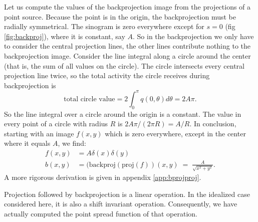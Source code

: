 \documentclass[11pt,oneside]{book}
\begin{document}
Let us compute the values of the backprojection image from the
projections of a point source. Because the point is in the origin, the
backprojection must be radially symmetrical. The sinogram is zero
everywhere except for $s = 0$ (fig \ref{fig:backproj}), where it is
constant, say $A$. So in the backprojection we only have to consider the
central projection lines, the other lines contribute nothing to the
backprojection image.  Consider the line integral along a circle
around the center (that is, the sum of all values on the circle). The
circle intersects every central projection line twice, so the total
activity the circle receives during backprojection is
\begin{equation}
  \mbox{total circle value} = 2 \int_0^\pi q(0, \theta) d \theta = 2 A\pi.
  \label{eq:bprojvalue}
\end{equation}
So the line integral over a circle around the origin is a constant. The value
in every point of a circle with radius $R$ is $2 A \pi / (2 \pi R) =
A/R$. In conclusion, starting with an image $f(x,y)$ which is zero everywhere,
except in the center where it equals $A$, we find:
\begin{align}
  f(x,y) &= A \delta(x) \delta(y)\\
 b(x,y) &= (\mbox{backproj}(\mbox{proj}(f))(x,y) \; = \;
  \frac{A}{\sqrt{x^2 + y^2}}.
\end{align}
A more rigorous derivation is given in appendix \ref{app:bprojproj}.

Projection followed by backprojection is a linear operation. In the
idealized case considered here, it is also a shift invariant
operation. Consequently, we have actually computed the point spread function
of that operation.
\end{document}
